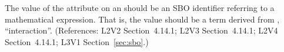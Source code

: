The value of the  attribute on an \Event should be
an SBO identifier referring to a mathematical expression.  That is, the
value should be a term derived from \sbointeractionID,
``interaction''.  (References: L2V2 Section~4.14.1; L2V3
Section~4.14.1; L2V4 Section~4.14.1; L3V1 Section~\ref{sec:sbo}.)

